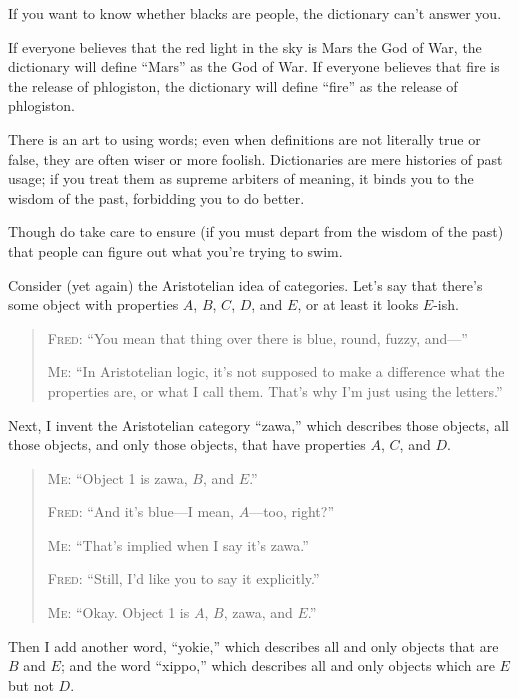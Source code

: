 {{{
 If you want to know whether blacks are people, the dictionary
can't answer you.}

{
 If everyone believes that the red light in the sky is Mars the God
of War, the dictionary will define
``Mars'' as the God of War. If
everyone believes that fire is the release of phlogiston, the
dictionary will define ``fire'' as
the release of phlogiston.}

{
 There is an art to using words; even when definitions are not
literally true or false, they are often wiser or more foolish.
Dictionaries are mere histories of past usage; if you treat them as
supreme arbiters of meaning, it binds you to the wisdom of the past,
forbidding you to do better.}

{
 Though do take care to ensure (if you must depart from the wisdom
of the past) that people can figure out what you're
trying to swim.}

\myendsectiontext


{
 Consider (yet again) the Aristotelian idea of categories.
Let's say that there's some object with
properties $A$, $B$, $C$, $D$, and $E$, or at least it looks $E$-ish.}

\begin{quotation}
{
 \textsc{Fred}: ``You mean that thing over there is blue,
round, fuzzy, and---''}

{
 \textsc{Me}: ``In Aristotelian logic, it's
not supposed to make a difference what the properties are, or what I
call them. That's why I'm just using
the letters.''}
\end{quotation}

{
 Next, I invent the Aristotelian category
``zawa,'' which describes those
objects, all those objects, and only those objects, that have
properties $A$, $C$, and $D$.}

\begin{quotation}
{
 \textsc{Me}: ``Object 1 is zawa, $B$, and
$E$.''}

{
 \textsc{Fred}: ``And it's blue---I mean,
$A$---too, right?''}

{
 \textsc{Me}: ``That's implied when I say
it's zawa.''}

{
 \textsc{Fred}: ``Still, I'd like you to
say it explicitly.''}

{
 \textsc{Me}: ``Okay. Object 1 is $A$, $B$, zawa, and
$E$.''}
\end{quotation}

{
 Then I add another word,
``yokie,'' which describes all and
only objects that are $B$ and $E$; and the word
``xippo,'' which describes all and
only objects which are $E$ but not $D$.}

}}
